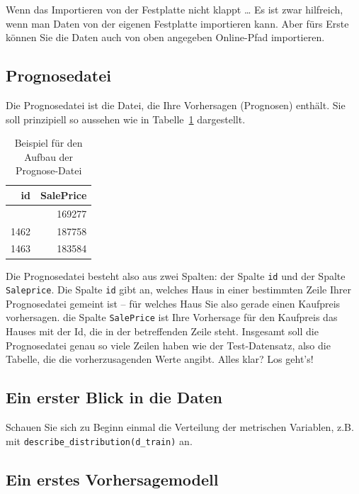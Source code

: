 \documentclass[
  letterpaper,
]{scrbook}
\theoremstyle{definition}
\theoremstyle{definition}
\theoremstyle{definition}
\theoremstyle{remark}
\begin{document}
Wenn das Importieren von der Festplatte nicht klappt \ldots{} Es ist
zwar hilfreich, wenn man Daten von der eigenen Festplatte importieren
kann. Aber fürs Erste können Sie die Daten auch von oben angegeben
Online-Pfad importieren.

\subsection{Prognosedatei}\label{prognosedatei}

Die Prognosedatei ist die Datei, die Ihre Vorhersagen (Prognosen)
enthält. Sie soll prinzipiell so aussehen wie in Tabelle~\ref{tbl-subm}
dargestellt.

\begin{longtable}[]{@{}rr@{}}

\caption{\label{tbl-subm}Beispiel für den Aufbau der Prognose-Datei}

\tabularnewline

\toprule\noalign{}
id & SalePrice \\
\midrule\noalign{}
\endhead
\bottomrule\noalign{}
\endlastfoot
1461 & 169277 \\
1462 & 187758 \\
1463 & 183584 \\

\end{longtable}

Die Prognosedatei besteht also aus zwei Spalten: der Spalte \texttt{id}
und der Spalte \texttt{Saleprice}. Die Spalte \texttt{id} gibt an,
welches Haus in einer bestimmten Zeile Ihrer Prognosedatei gemeint ist
-- für welches Haus Sie also gerade einen Kaufpreis vorhersagen. die
Spalte \texttt{SalePrice} ist Ihre Vorhersage für den Kaufpreis das
Hauses mit der Id, die in der betreffenden Zeile steht. Insgesamt soll
die Prognosedatei genau so viele Zeilen haben wie der Test-Datensatz,
also die Tabelle, die die vorherzusagenden Werte angibt. Alles klar? Los
geht's!

\subsection{Ein erster Blick in die
Daten}\label{ein-erster-blick-in-die-daten}

Schauen Sie sich zu Beginn einmal die Verteilung der metrischen
Variablen, z.B. mit \texttt{describe\_distribution(d\_train)} an.

\subsection{Ein erstes
Vorhersagemodell}\label{ein-erstes-vorhersagemodell}
\end{document}
